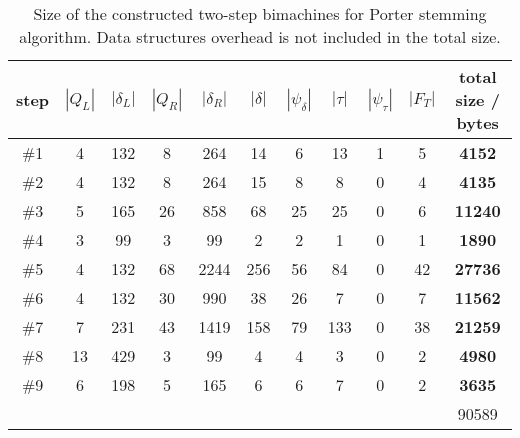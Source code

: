 \documentclass{article}
\newcommand{\len}[1]{\ensuremath{\left| #1 \right|}}
\begin{document}
	\begin{table}
		\centering
		\begin{adjustbox}{center=\textwidth}
		\begin{tabular}{*{10}{c|}>{\textbf\bgroup}c<{\egroup}}
			step & $\len{Q_L}$ & $\len{\delta_L}$ & $\len{Q_R}$ & $\len{\delta_R}$ & $\len{\delta}$ & $\len{\psi_\delta}$ & $\len{\tau}$ & $\len{\psi_\tau}$ & $\len{F_T}$ & total size / bytes \\ \hline\hline
			\#1 & 4 & 132 & 8 & 264 & 14 & 6 & 13 & 1 & 5 & \num{4152} \\ \hline
			\#2 & 4 & 132 & 8 & 264 & 15 & 8 & 8 & 0 & 4 & \num{4135} \\ \hline
			\#3 & 5 & 165 & 26 & 858 & 68 & 25 & 25 & 0 & 6 & \num{11240} \\ \hline
			\#4 & 3 & 99 & 3 & 99 & 2 & 2 & 1 & 0 & 1 & \num{1890} \\ \hline
			\#5 & 4 & 132 & 68 & 2244 & 256 & 56 & 84 & 0 & 42 & \num{27736} \\ \hline
			\#6 & 4 & 132 & 30 & 990 & 38 & 26 & 7 & 0 & 7 & \num{11562} \\ \hline
			\#7 & 7 & 231 & 43 & 1419 & 158 & 79 & 133 & 0 & 38 & \num{21259} \\ \hline
			\#8 & 13 & 429 & 3 & 99 & 4 & 4 & 3 & 0 & 2 & \num{4980} \\ \hline
			\#9 & 6 & 198 & 5 & 165 & 6 & 6 & 7 & 0 & 2 & \num{3635} \\ \hline\hline
			\multicolumn{10}{c|}{} & \num{90589} \\
		\end{tabular}
		\end{adjustbox}
		\caption{Size of the constructed two-step bimachines for Porter stemming algorithm. Data structures overhead is not included in the total size.}
		\label{table:size:Porter:tsbm}
	\end{table}
\end{document}
